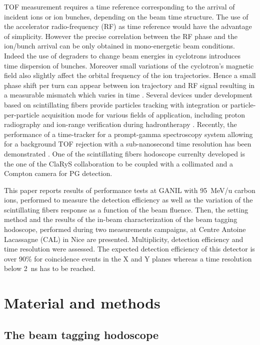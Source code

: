 \documentclass[a4paper,11pt]{article}
\begin{document}
TOF measurement requires a time reference corresponding to the arrival of incident ions or ion bunches, depending on the beam time structure. The use of the accelerator radio-frequency (RF) as time reference would have the advantage of simplicity. However the precise correlation between the RF phase and the ion/bunch arrival can be only obtained in mono-energetic beam conditions. 
Indeed the use of degraders to change beam energies in cyclotrons introduces time dispersion of bunches. Moreover small variations of the cyclotron’s magnetic field also slightly affect the orbital frequency of the ion trajectories. Hence a small phase shift per turn can appear between ion trajectory and RF signal resulting in a measurable mismatch which varies in time \cite{Werner2019}. 
Several devices under development based on scintillating fibers provide particles tracking with integration \cite{Leverington2018} or particle-per-particle \cite{Horikawa2004, Achenbach2008, Braccini2012} acquisition mode for various fields of application, including proton radiography \cite{Presti2013} and ion-range verification during hadrontherapy \cite{PAPA2016}. Recently, the performance of a time-tracker for a prompt-gamma spectroscopy system allowing for a background TOF rejection with a sub-nanosecond time resolution has been demonstrated \cite{Martins2020}. One of the scintillating fibers hodoscope currenlty developed is the one of the ClaRyS collaboration to be coupled with a collimated and a Compton camera for PG detection.

This paper reports results of performance tests at GANIL with 95~MeV/u carbon ions, performed to measure the detection efficiency as well as the variation of the scintillating fibers response as a function of the beam fluence. Then, the setting method and the results of the in-beam characterization of the beam tagging hodoscope, performed during two measurements campaigns, at Centre Antoine Lacassagne (CAL) in Nice are presented. Multiplicity, detection efficiency and time resolution were assessed. The expected detection efficiency of this detector is over 90\% for coincidence events in the X and Y planes whereas a time resolution below 2~ns has to be reached.

\section{Material and methods}
\subsection{The beam tagging hodoscope}
\end{document}
